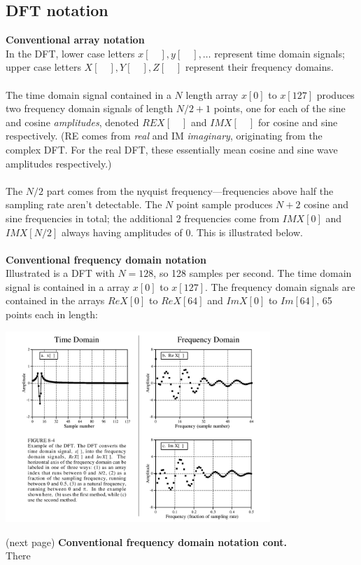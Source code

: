\documentclass{report}
\begin{document}
\subsection{DFT notation}
\textbf{Conventional array notation}\\
In the DFT, lower case letters $x[\quad],y[\quad],\ldots$ represent time domain signals; upper case letters
$X[\quad],Y[\quad],Z[\quad]$ 
represent their frequency domains.\\
\vspace{1mm}\\
The time domain signal contained in a $N$ length array $x[0]$ to $x[127]$ produces two frequency domain 
signals of length $N/2+1$ points, one for each of the sine and cosine \textit{amplitudes}, denoted 
$REX[\quad]$ and $IMX[\quad]$
for cosine and sine respectively. (RE comes from \textit{real} and IM \textit{imaginary}, originating from the
complex DFT. For the real DFT, these essentially mean
cosine and sine wave amplitudes respectively.)\\
\vspace{1mm}\\
The $N/2$ part comes from the nyquist frequency---frequencies above half the sampling rate aren't detectable. 
The $N$ point sample produces $N+2$ cosine and sine frequencies in total;
the additional 2 frequencies come from $IMX[0]$ and $IMX[N/2]$ always having amplitudes of 0. This is illustrated
below.\\
\vspace{1mm}\\
\textbf{Conventional frequency domain notation}\\
Illustrated is a DFT with $N=128$, so 128 samples per second. The time domain signal is contained in a array $x[0]$ 
to $x[127]$. The frequency domain signals are contained
in the arrays $ReX[0]$ to $ReX[64]$ and $ImX[0]$ to $Im[64]$, 65 points each in length:
\begin{center}
\includegraphics[width=10cm]{a13}\\
\end{center}
(next page)\newpage
\noindent\textbf{Conventional frequency domain notation cont.}\\
There
\end{document}

